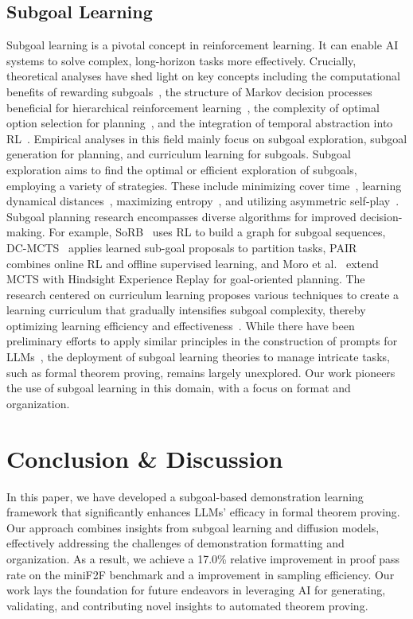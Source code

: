 \documentclass{article}
\begin{document}
\subsection{Subgoal Learning}
Subgoal learning is a pivotal concept in reinforcement learning. It can enable AI systems to solve complex, long-horizon tasks more effectively. Crucially, theoretical analyses have shed light on key concepts including the computational benefits of rewarding subgoals~\cite{zhai2022computational}, the structure of Markov decision processes beneficial for hierarchical reinforcement learning~\cite{wen2020efficiency}, the complexity of optimal option selection for planning~\cite{jinnai2019finding}, and the integration of temporal abstraction into RL~\cite{fruit2017regret}. Empirical analyses in this field mainly focus on subgoal exploration, subgoal generation for planning, and curriculum learning for subgoals. Subgoal exploration aims to find the optimal or efficient exploration of subgoals, employing a variety of strategies. These include minimizing cover time~\cite{jinnai2019discovering}, learning dynamical distances~\cite{hartikainen2019dynamical}, maximizing entropy~\cite{pitis2020maximum}, and utilizing asymmetric self-play~\cite{openai2021asymmetric}. Subgoal planning research encompasses diverse algorithms for improved decision-making. For example, SoRB~\cite{eysenbach2019search} uses RL to build a graph for subgoal sequences, DC-MCTS~\cite{parascandolo2020divide} applies learned sub-goal proposals to partition tasks, PAIR~\cite{li2022phasic} combines online RL and offline supervised learning, and Moro et al.~\cite{moro2022goal} extend MCTS with Hindsight Experience Replay for goal-oriented planning. The research centered on curriculum learning proposes various techniques to create a learning curriculum that gradually intensifies subgoal complexity, thereby optimizing learning efficiency and effectiveness~\cite{zhang2020automatic, zhang2021c}. While there have been preliminary efforts to apply similar principles in the construction of prompts for LLMs~\cite{khot2022decomposed}, the deployment of subgoal learning theories to manage intricate tasks, such as formal theorem proving, remains largely unexplored. Our work pioneers the use of subgoal learning in this domain, with a focus on format and organization.


\section{Conclusion \& Discussion}
In this paper, we have developed a subgoal-based demonstration learning framework that significantly enhances LLMs' efficacy in formal theorem proving. Our approach combines insights from subgoal learning and diffusion models, effectively addressing the challenges of demonstration formatting and organization. As a result, we achieve a 17.0\% relative improvement in proof pass rate on the miniF2F benchmark and a  improvement in sampling efficiency. Our work lays the foundation for future endeavors in leveraging AI for generating, validating, and contributing novel insights to automated theorem proving.
\end{document}
